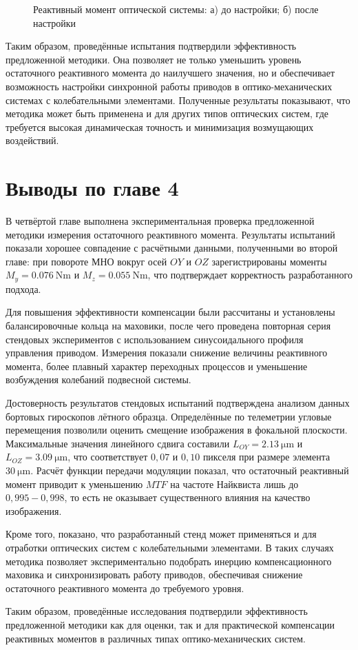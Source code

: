 \begin{figure}[h!]
\begin{minipage}[b]{0.49\linewidth}
 	\end{minipage}
 	\caption{Реактивный момент оптической системы: а) до настройки; б) после настройки}
 	\label{fig:scan-mom}
 \end{figure}
 

 Таким образом, проведённые испытания подтвердили эффективность предложенной методики. Она позволяет не только уменьшить уровень остаточного реактивного момента до наилучшего значения, но и обеспечивает возможность настройки синхронной работы приводов в оптико-механических системах с колебательными элементами. Полученные результаты показывают, что методика может быть применена и для других типов оптических систем, где требуется высокая динамическая точность и минимизация возмущающих воздействий.
 
 
 \section*{Выводы по главе 4}
 
В четвёртой главе выполнена экспериментальная проверка предложенной методики измерения остаточного реактивного момента. Результаты испытаний показали хорошее совпадение с расчётными данными, полученными во второй главе: при повороте МНО вокруг осей $OY$ и $OZ$ зарегистрированы моменты $M_y = \SI{0,076}{\newton\meter}$ и $M_z=\SI{0,055}{\newton\meter}$, что подтверждает корректность разработанного подхода.

Для повышения эффективности компенсации были рассчитаны и установлены балансировочные кольца на маховики, после чего проведена повторная серия стендовых экспериментов с использованием синусоидального профиля управления приводом. Измерения показали снижение величины реактивного момента, более плавный характер переходных процессов и уменьшение возбуждения колебаний подвесной системы. 

Достоверность результатов стендовых испытаний подтверждена анализом данных бортовых гироскопов лётного образца. Определённые по телеметрии угловые перемещения позволили оценить смещение изображения в фокальной плоскости. Максимальные значения линейного сдвига составили $L_{OY} = \SI{2,13}{\micro\meter}$ и $L_{OZ} = \SI{3,09}{\micro\meter}$, что соответствует $0,07$ и $0,10$ пикселя при размере элемента $\SI{30}{\micro\meter}$.
Расчёт функции передачи модуляции показал, что остаточный реактивный момент приводит к уменьшению 
$MTF$ на частоте Найквиста лишь до $0,995-0,998$, то есть не оказывает существенного влияния на качество изображения.
 
Кроме того, показано, что разработанный стенд может применяться и для отработки оптических систем с колебательными элементами. В таких случаях методика позволяет экспериментально подобрать инерцию компенсационного маховика и синхронизировать работу приводов, обеспечивая снижение остаточного реактивного момента до требуемого уровня.

Таким образом, проведённые исследования подтвердили эффективность предложенной методики как для оценки, так и для практической компенсации реактивных моментов в различных типах оптико-механических систем.
 
 
\FloatBarrier




